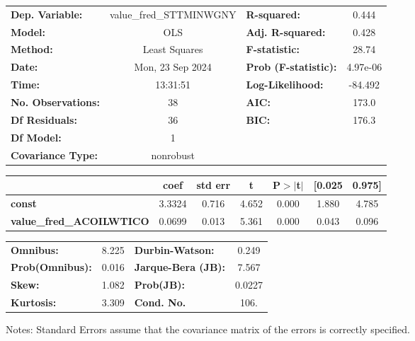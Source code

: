 \begin{center}
\begin{tabular}{lclc}
\toprule
\textbf{Dep. Variable:}          & value\_fred\_STTMINWGNY & \textbf{  R-squared:         } &     0.444   \\
\textbf{Model:}                  &           OLS           & \textbf{  Adj. R-squared:    } &     0.428   \\
\textbf{Method:}                 &      Least Squares      & \textbf{  F-statistic:       } &     28.74   \\
\textbf{Date:}                   &     Mon, 23 Sep 2024    & \textbf{  Prob (F-statistic):} &  4.97e-06   \\
\textbf{Time:}                   &         13:31:51        & \textbf{  Log-Likelihood:    } &   -84.492   \\
\textbf{No. Observations:}       &              38         & \textbf{  AIC:               } &     173.0   \\
\textbf{Df Residuals:}           &              36         & \textbf{  BIC:               } &     176.3   \\
\textbf{Df Model:}               &               1         & \textbf{                     } &             \\
\textbf{Covariance Type:}        &        nonrobust        & \textbf{                     } &             \\
\bottomrule
\end{tabular}
\begin{tabular}{lcccccc}
                                 & \textbf{coef} & \textbf{std err} & \textbf{t} & \textbf{P$> |$t$|$} & \textbf{[0.025} & \textbf{0.975]}  \\
\midrule
\textbf{const}                   &       3.3324  &        0.716     &     4.652  &         0.000        &        1.880    &        4.785     \\
\textbf{value\_fred\_ACOILWTICO} &       0.0699  &        0.013     &     5.361  &         0.000        &        0.043    &        0.096     \\
\bottomrule
\end{tabular}
\begin{tabular}{lclc}
\textbf{Omnibus:}       &  8.225 & \textbf{  Durbin-Watson:     } &    0.249  \\
\textbf{Prob(Omnibus):} &  0.016 & \textbf{  Jarque-Bera (JB):  } &    7.567  \\
\textbf{Skew:}          &  1.082 & \textbf{  Prob(JB):          } &   0.0227  \\
\textbf{Kurtosis:}      &  3.309 & \textbf{  Cond. No.          } &     106.  \\
\bottomrule
\end{tabular}
\end{center}

Notes: \newline
 [1] Standard Errors assume that the covariance matrix of the errors is correctly specified.